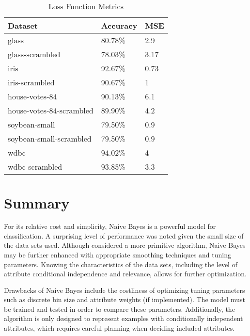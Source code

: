 \documentclass[twoside,11pt]{article}
\begin{document}
\begin{table}[h]
	\centering
	\caption{Loss Function Metrics} \label{tab:metrics}
	\begin{tabular}{|l|l|l|}
		\hline
		Dataset                  & Accuracy & MSE  \\ \hline
		glass                    & 80.78\%  & 2.9  \\ \hline
		glass-scrambled          & 78.03\%  & 3.17 \\ \hline
		iris                     & 92.67\%  & 0.73 \\ \hline
		iris-scrambled           & 90.67\%  & 1    \\ \hline
		house-votes-84           & 90.13\%  & 6.1  \\ \hline
		house-votes-84-scrambled & 89.90\%  & 4.2  \\ \hline
		soybean-small            & 79.50\%  & 0.9  \\ \hline
		soybean-small-scrambled  & 79.50\%  & 0.9  \\ \hline
		wdbc                     & 94.02\%  & 4    \\ \hline
		wdbc-scrambled           & 93.85\%  & 3.3  \\ \hline
	\end{tabular}
\end{table}

\section{Summary}

For its relative cost and simplicity, Naive Bayes is a powerful model for classification. A surprising level of performance was noted given the small size of the data sets used. Although considered a more primitive algorithm, Naive Bayes may be further enhanced with appropriate smoothing techniques and tuning parameters. Knowing the characteristics of the data sets, including the level of attribute conditional independence and relevance, allows for further optimization. 

Drawbacks of Naive Bayes include the costliness of optimizing tuning parameters such as discrete bin size and attribute weights (if implemented). The model must be trained and tested in order to compare these parameters. Additionally, the algorithm is only designed to represent examples with conditionally independent attributes, which requires careful planning when deciding included attributes.



\end{document}
